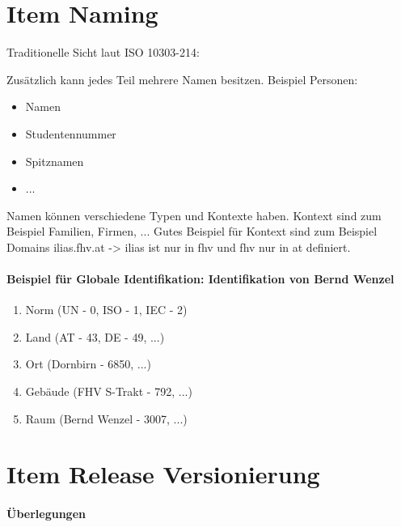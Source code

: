 \section{Item Naming}

Traditionelle Sicht laut ISO 10303-214:

Zusätzlich kann jedes Teil mehrere Namen besitzen. Beispiel Personen:
\begin{itemize}
\item Namen
\item Studentennummer
\item Spitznamen
\item ...
\end{itemize}

Namen können verschiedene Typen und Kontexte haben. Kontext sind zum Beispiel Familien, Firmen, ... Gutes Beispiel für Kontext sind zum Beispiel Domains ilias.fhv.at -> ilias ist nur in fhv und fhv nur in at definiert.

\paragraph{Beispiel für Globale Identifikation: Identifikation von Bernd Wenzel}
\begin{enumerate}
\item Norm (UN - 0, ISO - 1, IEC - 2)
\item Land (AT - 43, DE - 49, ...)
\item Ort (Dornbirn - 6850, ...)
\item Gebäude (FHV S-Trakt - 792, ...)
\item Raum (Bernd Wenzel - 3007, ...)
\end{enumerate}


\newpage
\section{Item Release Versionierung}

\paragraph{Überlegungen}

